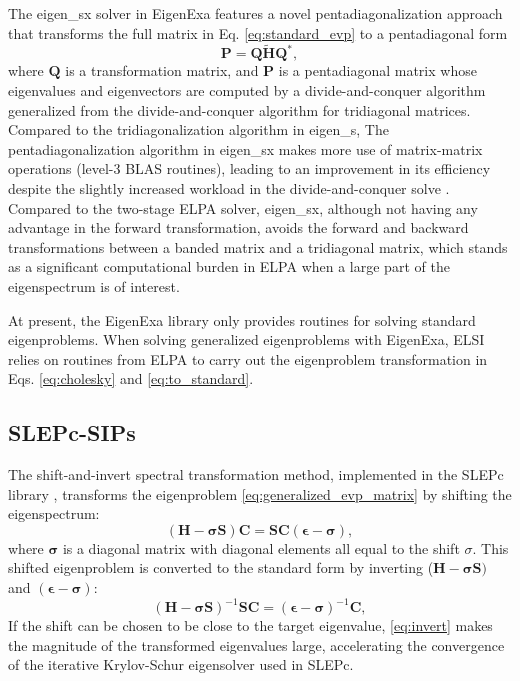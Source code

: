 \documentclass{report}
\begin{document}
The eigen\_sx solver in EigenExa features a novel pentadiagonalization approach that transforms the full matrix in Eq. \ref{eq:standard_evp} to a pentadiagonal form
\begin{equation}
\label{eq:eigen_sx}
\boldsymbol{P} = \boldsymbol{Q} \boldsymbol{\tilde{H}} \boldsymbol{Q}^* ,
\end{equation}
where $\boldsymbol{Q}$ is a transformation matrix, and $\boldsymbol{P}$ is a pentadiagonal matrix whose eigenvalues and eigenvectors are computed by a divide-and-conquer algorithm generalized from the divide-and-conquer algorithm for tridiagonal matrices. Compared to the tridiagonalization algorithm in eigen\_s, The pentadiagonalization algorithm in eigen\_sx makes more use of matrix-matrix operations (level-3 BLAS routines), leading to an improvement in its efficiency despite the slightly increased workload in the divide-and-conquer solve \cite{eigenexa_imamura_2011,eigenexa_fukaya_2015}. Compared to the two-stage ELPA solver, eigen\_sx, although not having any advantage in the forward transformation, avoids the forward and backward transformations between a banded matrix and a tridiagonal matrix, which stands as a significant computational burden in ELPA when a large part of the eigenspectrum is of interest.

At present, the EigenExa library only provides routines for solving standard eigenproblems. When solving generalized eigenproblems with EigenExa, ELSI relies on routines from ELPA to carry out the eigenproblem transformation in Eqs. \ref{eq:cholesky} and \ref{eq:to_standard}.

\subsection{SLEPc-SIPs}
\label{subsec:solvers_sips}
The shift-and-invert spectral transformation method, implemented in the SLEPc library \cite{slepc_hernandez_2005}, transforms the eigenproblem \ref{eq:generalized_evp_matrix} by shifting the eigenspectrum:
\begin{equation}
\label{eq:shift}
(\boldsymbol{H} - \boldsymbol{\sigma} \boldsymbol{S}) \boldsymbol{C} = \boldsymbol{S} \boldsymbol{C} (\boldsymbol{\epsilon} - \boldsymbol{\sigma}) ,
\end{equation}
where $\boldsymbol{\sigma}$ is a diagonal matrix with diagonal elements all equal to the shift $\sigma$. This shifted eigenproblem is converted to the standard form by inverting ($\boldsymbol{H} - \boldsymbol{\sigma S})$ and $(\boldsymbol{\epsilon - \sigma})$:
\begin{equation}
\label{eq:invert}
(\boldsymbol{H} - \boldsymbol{\sigma S})^{-1} \boldsymbol{S} \boldsymbol{C} = (\boldsymbol{\epsilon - \sigma})^{-1} \boldsymbol{C} ,
\end{equation}
If the shift can be chosen to be close to the target eigenvalue, \ref{eq:invert} makes the magnitude of the transformed eigenvalues large, accelerating the convergence of the iterative Krylov-Schur eigensolver used in SLEPc.
\end{document}
